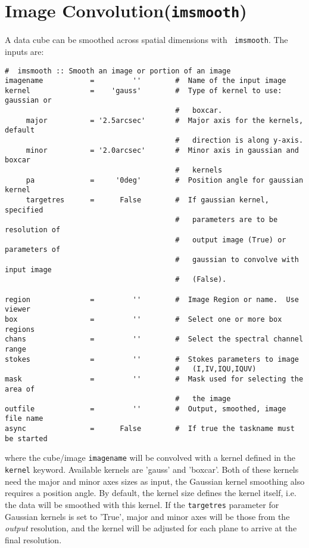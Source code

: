 \section{Image Convolution({\tt imsmooth})}
\label{section:analysis.imsmooth}

A data cube can be smoothed across spatial dimensions with {\tt
  imsmooth}. The inputs are:\\ 
\small
\begin{verbatim}
#  imsmooth :: Smooth an image or portion of an image
imagename           =         ''        #  Name of the input image
kernel              =    'gauss'        #  Type of kernel to use: gaussian or
                                        #   boxcar.
     major          = '2.5arcsec'       #  Major axis for the kernels, default
                                        #   direction is along y-axis.
     minor          = '2.0arcsec'       #  Minor axis in gaussian and boxcar
                                        #   kernels
     pa             =     '0deg'        #  Position angle for gaussian kernel
     targetres      =      False        #  If gaussian kernel, specified
                                        #   parameters are to be resolution of
                                        #   output image (True) or parameters of
                                        #   gaussian to convolve with input image
                                        #   (False).

region              =         ''        #  Image Region or name.  Use viewer
box                 =         ''        #  Select one or more box regions
chans               =         ''        #  Select the spectral channel range
stokes              =         ''        #  Stokes parameters to image
                                        #   (I,IV,IQU,IQUV)
mask                =         ''        #  Mask used for selecting the area of
                                        #   the image
outfile             =         ''        #  Output, smoothed, image file name
async               =      False        #  If true the taskname must be started
\end{verbatim}
\normalsize
where the cube/image {\tt imagename} will be convolved with a kernel
defined in the {\tt kernel} keyword. Available kernels are 'gauss' and
'boxcar'. Both of these kernels need the major and minor axes sizes as
input, the Gaussian kernel smoothing also requires a position
angle. By default, the kernel size defines the kernel itself, i.e. the
data will be smoothed with this kernel. If the {\tt targetres} parameter
for Gaussian kernels is set to 'True', major and minor axes will be
those from the {\it output} resolution, and the kernel will be
adjusted for each plane to arrive at the final resolution. 

